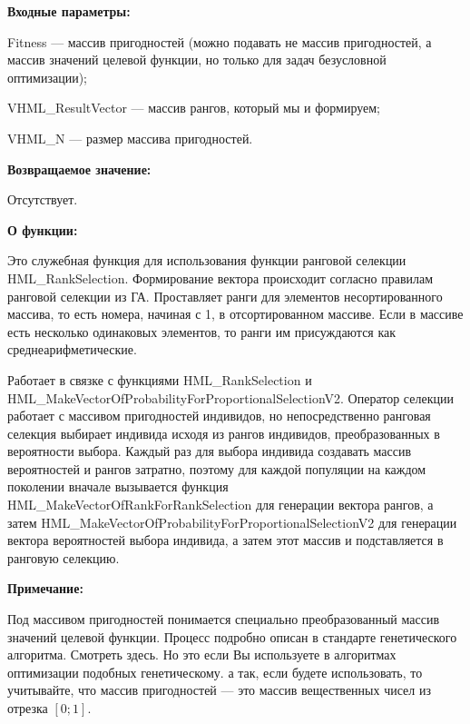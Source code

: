 \textbf{Входные параметры:}

Fitness --- массив пригодностей (можно подавать не массив пригодностей, а массив значений целевой функции, но только для задач безусловной оптимизации);
 
VHML\_ResultVector --- массив рангов, который мы и формируем;
 
VHML\_N --- размер массива пригодностей.

\textbf{Возвращаемое значение:} 
 
Отсутствует.
 
\textbf{О функции:}

Это служебная функция для использования функции ранговой селекции HML\_RankSelection. Формирование вектора происходит согласно правилам ранговой селекции из ГА. Проставляет ранги для элементов несортированного массива, то есть номера, начиная с 1, в отсортированном массиве. Если в массиве есть несколько одинаковых элементов, то ранги им присуждаются как среднеарифметические.

Работает в связке с функциями HML\_RankSelection и HML\_MakeVectorOfProbabilityForProportionalSelectionV2. Оператор селекции работает с массивом пригодностей индивидов, но непосредственно ранговая селекция выбирает индивида исходя из рангов индивидов, преобразованных в вероятности выбора. Каждый раз для выбора индивида создавать массив вероятностей и рангов затратно, поэтому для каждой популяции на каждом поколении вначале вызывается функция HML\_MakeVectorOfRankForRankSelection для генерации вектора рангов, а затем HML\_MakeVectorOfProbabilityForProportionalSelectionV2 для генерации вектора вероятностей выбора индивида, а затем этот массив и подставляется в ранговую селекцию.

\textbf{Примечание:}

 Под массивом пригодностей понимается специально преобразованный массив значений целевой функции. Процесс подробно описан в стандарте генетического алгоритма. Смотреть здесь. Но это если Вы используете в алгоритмах оптимизации подобных генетическому. а так, если будете использовать, то учитывайте, что массив пригодностей --- это массив вещественных чисел из отрезка $[0;1]$.
